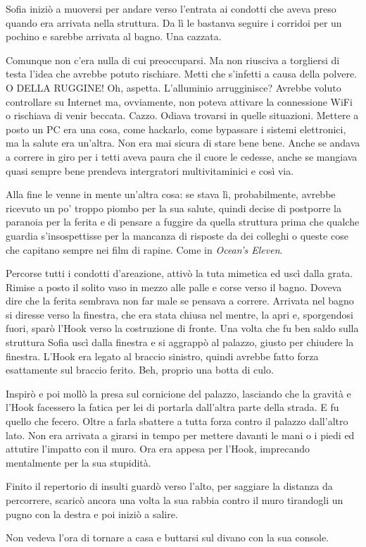     Sofia iniziò a muoversi per andare verso l'entrata ai condotti che aveva preso quando era arrivata nella struttura.
    Da lì le bastanva seguire i corridoi per un pochino e sarebbe arrivata al bagno. Una cazzata.
  
    Comunque non c'era nulla di cui preoccuparsi. Ma non riusciva a torgliersi di testa l'idea che avrebbe potuto
    rischiare. Metti che s'infetti a causa della polvere. O DELLA RUGGINE! Oh, aspetta. L'alluminio arrugginisce?
    Avrebbe voluto controllare su Internet ma, ovviamente, non poteva attivare la connessione WiFi o rischiava di venir
    beccata. Cazzo. Odiava trovarsi in quelle situazioni. Mettere a posto un PC era una cosa, come hackarlo, come
    bypassare i sistemi elettronici, ma la salute era un'altra. Non era mai sicura di stare bene bene. Anche se andava a
    correre in giro per i tetti aveva paura che il cuore le cedesse, anche se mangiava quasi sempre bene prendeva
    intergratori multivitaminici e così via.

    Alla fine le venne in mente un'altra cosa: se stava lì, probabilmente, avrebbe ricevuto un po' troppo piombo per la
    sua salute, quindi decise di postporre la paranoia per la ferita e di pensare a fuggire da quella struttura prima
    che qualche guardia s'insospettisse per la mancanza di risposte da dei colleghi o queste cose che capitano sempre
    nei film di rapine. Come in \emph{Ocean's Eleven}.

    Percorse tutti i condotti d'areazione, attivò la tuta mimetica ed uscì dalla grata. Rimise a posto il solito vaso in
    mezzo alle palle e corse verso il bagno. Doveva dire che la ferita sembrava non far male se pensava a correre.
    Arrivata nel bagno si diresse verso la finestra, che era stata chiusa nel mentre, la apri e, sporgendosi fuori,
    sparò l'Hook verso la costruzione di fronte. Una volta che fu ben saldo sulla struttura Sofia uscì dalla finestra e
    si aggrappò al palazzo, giusto per chiudere la finestra. L'Hook era legato al braccio sinistro, quindi avrebbe fatto
    forza esattamente sul braccio ferito. Beh, proprio una botta di culo.

    Inspirò e poi mollò la presa sul cornicione del palazzo, lasciando che la gravità e l'Hook facessero la fatica per
    lei di portarla dall'altra parte della strada. E fu quello che fecero. Oltre a farla sbattere a tutta forza contro
    il palazzo dall'altro lato. Non era arrivata a girarsi in tempo per mettere davanti le mani o i piedi ed attutire
    l'impatto con il muro. Ora era appesa per l'Hook, imprecando mentalmente per la sua stupidità.

    Finito il repertorio di insulti guardò verso l'alto, per saggiare la distanza da percorrere, scaricò ancora una
    volta la sua rabbia contro il muro tirandogli un pugno con la destra e poi iniziò a salire.

    Non vedeva l'ora di tornare a casa e buttarsi sul divano con la sua console.
